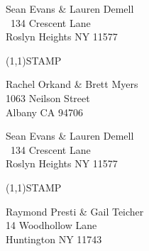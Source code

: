 \documentclass[12pt]{article}
\begin{document}
\begin{minipage}{.5\linewidth} \noindent
Sean Evans \& Lauren Demell\\\ 
134 Crescent Lane\\ 
Roslyn Heights NY 11577
\end{minipage}
\begin{minipage}{.5\linewidth \hspace{-.2in} \vspace{-.3in}}
\begin{flushright}
\framebox(1,1){STAMP}
\end{flushright}
\end{minipage}

\begin{center} \begin{Huge} \vspace*{\fill}
Rachel Orkand \& Brett Myers\\
1063 Neilson Street\\
Albany CA 94706\\
\vspace{\fill} \end{Huge} \end{center}

\clearpage

\begin{minipage}{.5\linewidth} \noindent
Sean Evans \& Lauren Demell\\\ 
134 Crescent Lane\\ 
Roslyn Heights NY 11577
\end{minipage}
\begin{minipage}{.5\linewidth \hspace{-.2in} \vspace{-.3in}}
\begin{flushright}
\framebox(1,1){STAMP}
\end{flushright}
\end{minipage}

\begin{center} \begin{Huge} \vspace*{\fill}
Raymond Presti \& Gail Teicher\\
14 Woodhollow Lane\\
Huntington NY 11743\\
\vspace{\fill} \end{Huge} \end{center}

\clearpage
\end{document}
